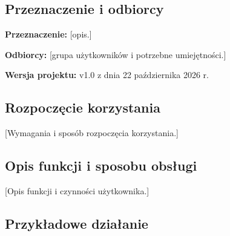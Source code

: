 \documentclass[11pt,a4paper,oneside]{article}
\newif\ifpodpowiedzi
\newcommand{\podpowiedz}[1]{\ifpodpowiedzi\par\begingroup\small\color{hintcolor}\textit{Wskazówka: #1}\par\endgroup\fi}
\newcommand{\pole}[1]{\textnormal{[#1]}}
\begin{document}
\subsection{Przeznaczenie i odbiorcy}
\podpowiedz{Wyjaśnij, do czego służy rozwiązanie, kto może z niego korzystać i jakie zadania umożliwia. Podaj wersję projektu, której dotyczy instrukcja. Używaj języka zrozumiałego dla wskazanego odbiorcy.}
\textbf{Przeznaczenie:} \pole{opis.}\par
\textbf{Odbiorcy:} \pole{grupa użytkowników i potrzebne umiejętności.}\par
\textbf{Wersja projektu:} {v1.0 z dnia 22 października 2026 r.}


\subsection{Rozpoczęcie korzystania}
\podpowiedz{Podaj wymagania istotne dla użytkownika i sposób rozpoczęcia pracy: adres aplikacji, uruchamiany plik, odtwarzacz, urządzenie lub punkt wejścia do biblioteki. Wskaż potrzebne konto, uprawnienia i dane wejściowe, jeśli występują. Odwołaj się do dokumentacji instalacyjnej, jeśli jest wymagana; nie opisuj środowiska deweloperskiego.}
\pole{Wymagania i sposób rozpoczęcia korzystania.}

\subsection{Opis funkcji i sposobu obsługi}
\podpowiedz{Opisz dostępne funkcje oraz sposób ich użycia, grupując je według zadań użytkownika. Wyjaśnij istotne elementy interfejsu, polecenia i ustawienia. Dla animacji może to być sposób odtwarzania i korzystania z przekazanych formatów; dla prototypu - sterowanie; dla biblioteki - publiczny interfejs i przykłady wywołań.}
\pole{Opis funkcji i czynności użytkownika.}
\podpowiedz{Dodaj czytelne zrzuty ekranu lub ilustracje tam, gdzie pomagają wykonać zadanie. Każdy rysunek powinien mieć podpis i odwołanie w tekście przez \texttt{\textbackslash ref}. Nie zastępuj instrukcji samymi obrazami.}

\subsection{Przykładowe działanie}
\podpowiedz{Przedstaw konkretne scenariusze najważniejszych zadań. Dla każdego podaj cel, warunki początkowe, przykładowe dane, kolejne kroki i oczekiwany rezultat. Przykład powinien być możliwy do odtworzenia. Powielaj poniższy blok według potrzeb.}
\end{document}

